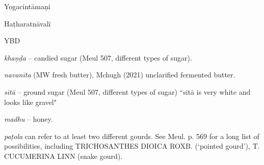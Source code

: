 \begin{ekdosis}
\begin{testimonia}[hp01_062]
Yogacintāmaṇi

\begin{versinnote}
\end{versinnote}

Haṭharatnāvalī

\begin{versinnote}
\end{versinnote}

YBD

\begin{versinnote}
\end{versinnote}

\end{testimonia}

\begin{philcomm}[hp01_062]
\emph{khaṇḍa} -- candied sugar (Meul 507, different types of sugar).

\emph{navanīta} (MW fresh butter), Mchugh (2021) unclarified fermented butter.

\emph{sitā} -- ground sugar (Meul 507, different types of sugar) ``sitā is very white and looks like gravel"

\emph{madhu} -- honey.

\emph{paṭola} can refer to at least two different gourds. See Meul. p. 569 for a long list of possibilities, including TRICHOSANTHES DIOICA ROXB. (`pointed gourd'), T. CUCUMERINA LINN (snake gourd).


\end{philcomm}
\end{ekdosis}
